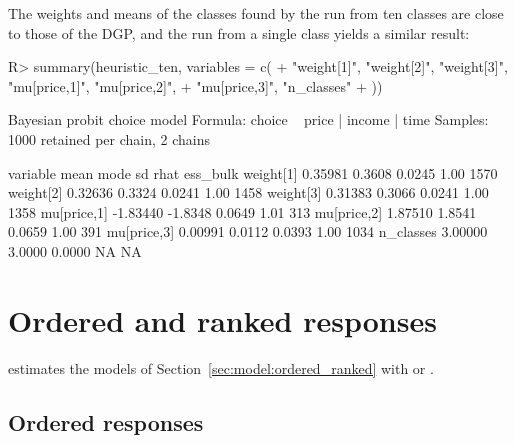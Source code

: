 \documentclass[article,shortnames]{jss}
\newcommand{\fct}[1]{\code{#1()}}
\begin{document}
%
The weights and means of the classes found by the run from ten classes are close
to those of the DGP, and the run from a single class yields a similar result:
%
\begin{Schunk}
\begin{Sinput}
R> summary(heuristic_ten, variables = c(
+    "weight[1]", "weight[2]", "weight[3]", "mu[price,1]", "mu[price,2]",
+    "mu[price,3]", "n_classes"
+  ))
\end{Sinput}
\begin{Soutput}
Bayesian probit choice model
Formula: choice ~ price | income | time 
Samples: 1000 retained per chain, 2 chains

    variable     mean    mode     sd rhat ess_bulk
   weight[1]  0.35981  0.3608 0.0245 1.00     1570
   weight[2]  0.32636  0.3324 0.0241 1.00     1458
   weight[3]  0.31383  0.3066 0.0241 1.00     1358
 mu[price,1] -1.83440 -1.8348 0.0649 1.01      313
 mu[price,2]  1.87510  1.8541 0.0659 1.00      391
 mu[price,3]  0.00991  0.0112 0.0393 1.00     1034
   n_classes  3.00000  3.0000 0.0000   NA       NA
\end{Soutput}
\end{Schunk}

\section{Ordered and ranked responses} \label{sec:ordered_ranked}

\fct{fit} estimates the models of Section~\ref{sec:model:ordered_ranked} with
 or .

\subsection{Ordered responses} \label{sec:ordered}
\end{document}
